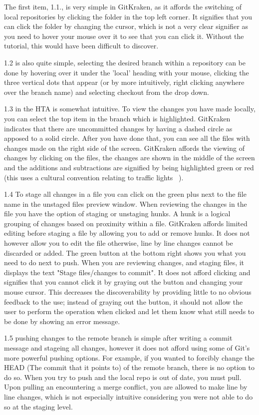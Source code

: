 \documentclass{sigchi}
\begin{document}
The first item, 1.1., is very simple in GitKraken, as it affords the switching of local repositories by clicking the folder
 in the top left corner. It signifies that you can click the folder by changing the cursor, which is not a very clear signifier 
as you need to hover your mouse over it to see that you can click it. Without the tutorial, this would have been difficult to discover.

1.2 is also quite simple, selecting the desired branch within a repository can be done by hovering over it under the 
'local' heading with your mouse, clicking the three vertical dots that appear (or by more intuitively, right clicking anywhere over the branch name) 
and selecting checkout from the drop down.

1.3 in the HTA is somewhat intuitive. To view the changes you have made locally, you can select the top item in
the branch which is highlighted. GitKraken indicates that there are uncommitted changes by having a dashed circle as apposed to a solid circle.
After you have done that, you can see all the files with changes made on the right side of the screen.
GitKraken affords the viewing of changes by clicking on the files, the changes are shown in the middle of the screen and the additions and subtractions are signified by being highlighted green or red (this uses a cultural convention relating to traffic lights ~\cite{Norman:2013}). 

1.4 To stage all changes in a file you can click on the green plus next to the file name in the unstaged files preview window. When reviewing the changes in the file you have the option of staging or unstaging hunks. A hunk is a logical grouping of changes based on proximity within a file. GitKraken affords limited editing before staging a file by allowing you to add or remove hunks. It does not however allow you to edit the file otherwise, line by line changes cannot be discarded or added.
The green button at the bottom right shows you what you need to do next to push. When you are reviewing changes, and staging files, it displays the text "Stage files/changes to commit". It does not afford clicking and signifies that you cannot click it by graying out the button and changing your mouse cursor. This decreases the discoverability by providing little to no obvious feedback to the use; instead of graying out the button, it should not allow the user to perform the operation when clicked and let them know what still needs to be done by showing an error message.

1.5 pushing changes to the remote branch is simple after writing a commit message and stageing all changes, however it does not afford using some of Git's more powerful pushing options. For example, if you wanted to forcibly change the HEAD (The commit that it points to) of the remote branch, there is no option to do so. When you try to push and the local repo is out of date, you must pull. Upon pulling an encountering a merge conflict, you are allowed to make line by line changes, which is not especially intuitive considering you were not able to do so at the staging level.
\end{document}
